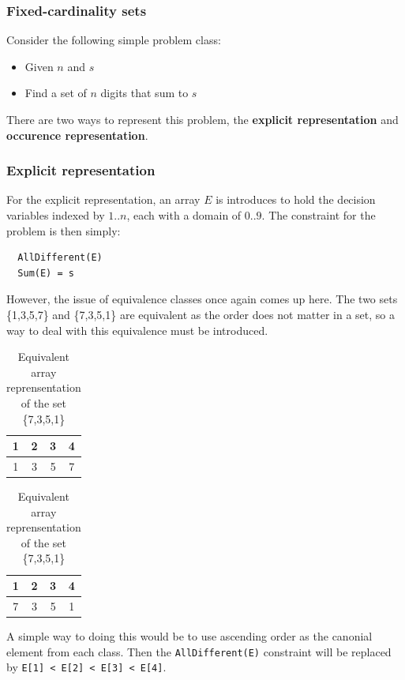 \documentclass[CS4402-Notes.tex]{subfiles}
\begin{document}
\subsubsection{Fixed-cardinality sets}
Consider the following simple problem class:
\begin{itemize}
\item Given $n$ and $s$
\item Find a set of $n$ digits that sum to $s$
\end{itemize}
There are two ways to represent this problem, the \textbf{explicit representation} and \textbf{occurence representation}.

\subsubsection{Explicit representation}
For the explicit representation, an array $E$ is introduces to hold the decision variables indexed by $1..n$, each with a domain of $0..9$. The constraint for the problem is then simply:
\begin{lstlisting}
  AllDifferent(E)
  Sum(E) = s
\end{lstlisting}
However, the issue of equivalence classes once again comes up here. The two sets \{1,3,5,7\} and \{7,3,5,1\} are equivalent as the order does not matter in a set, so a way to deal with this equivalence must be introduced.
\begin{table}[H]
\centering
\begin{tabular}{| c | c | c | c |}
\hline
\textbf{1} & \textbf{2} & \textbf{3} & \textbf{4} \\
\hline
1 & 3 & 5 & 7 \\
\hline
\end{tabular}
\caption{Explicit array representation of the set \{1,3,5,7\}}
\vspace{1cm}
\begin{tabular}{| c | c | c | c |}
\hline
\textbf{1} & \textbf{2} & \textbf{3} & \textbf{4} \\
\hline
7 & 3 & 5 & 1 \\
\hline
\end{tabular}
\caption{Equivalent array reprensentation of the set \{7,3,5,1\}}
\end{table}
A simple way to doing this would be to use ascending order as the canonial element from each class. Then the \texttt{AllDifferent(E)} constraint will be replaced by \texttt{E[1] < E[2] < E[3] < E[4]}.
\end{document}
